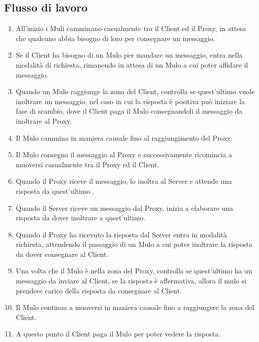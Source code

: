 \documentclass[13pt,a4paper]{article}
\begin{document}
\subsection{Flusso di lavoro}
\begin{enumerate}
	\item All'inizio i Muli camminano casualmente tra il Client ed il Proxy, in attesa che qualcuno abbia bisogno di loro per consegnare un messaggio.
	
	\item Se il Client ha bisogno di un Mulo per mandare un messaggio, entra nella modalità di richiesta, rimanendo in attesa di un Mulo a cui poter affidare il messaggio.
	
	\item Quando un Mulo raggiunge la zona del Client, controlla se quest'ultimo vuole inoltrare un messaggio, nel caso in cui la risposta è positiva può iniziare la fase di scambio, dove il Client paga il Mulo consegnandoli il messaggio da inoltrare al Proxy.
	
	\item Il Mulo cammina in maniera causale fino al raggiungimento del Proxy.
	
	\item Il Mulo consegna il messaggio al Proxy e successivamente ricomincia a muoversi casualmente tra il Proxy ed il Client.
	
	\item Quando il Proxy riceve il messaggio, lo inoltra al Server e attende una risposta da quest'ultimo .
	
	\item Quando il Server riceve un messaggio dal Proxy, inizia a elaborare una risposta da dover inoltrare a quest'ultimo.
	
	\item Quando il Proxy ha ricevuto la risposta dal Server entra in modalità richiesta, attendendo il passaggio  di un Mulo a cui poter inoltrare la risposta da dover consegnare al Client. 
	
	\item Una volta che il Mulo è nella zona del Proxy, controlla se quest'ultimo ha un messaggio da inviare al Client, se la risposta è affermativa, allora il mulo si prendere carico della risposta da consegnare al Client. 
	
	\item Il Mulo continua a muoversi in maniera causale fino a raggiungere la zona del Client. 
	
	\item A questo punto il Client paga il Mulo per poter vedere la risposta.
\end{enumerate}
\end{document}

